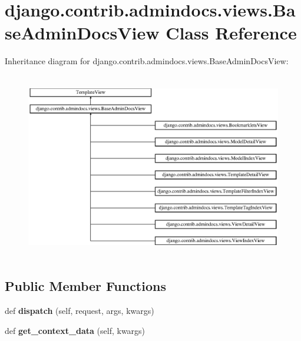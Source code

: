 \hypertarget{classdjango_1_1contrib_1_1admindocs_1_1views_1_1_base_admin_docs_view}{}\section{django.\+contrib.\+admindocs.\+views.\+Base\+Admin\+Docs\+View Class Reference}
\label{classdjango_1_1contrib_1_1admindocs_1_1views_1_1_base_admin_docs_view}
Inheritance diagram for django.\+contrib.\+admindocs.\+views.\+Base\+Admin\+Docs\+View\+:\begin{figure}[H]
\begin{center}
\leavevmode
\includegraphics[height=8.187134cm]{classdjango_1_1contrib_1_1admindocs_1_1views_1_1_base_admin_docs_view}
\end{center}
\end{figure}
\subsection*{Public Member Functions}
\begin{DoxyCompactItemize}
\item 
\mbox{\label{classdjango_1_1contrib_1_1admindocs_1_1views_1_1_base_admin_docs_view_a8f8f18bb035cf054c987a85094e52afa}} 
def {\bfseries dispatch} (self, request, args, kwargs)
\item 
\mbox{\label{classdjango_1_1contrib_1_1admindocs_1_1views_1_1_base_admin_docs_view_a7169a364ef616b8747e173e11c922bca}} 
def {\bfseries get\+\_\+context\+\_\+data} (self, kwargs)
\end{DoxyCompactItemize}
